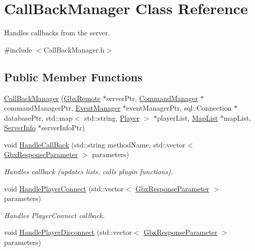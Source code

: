 \hypertarget{classCallBackManager}{\section{Call\-Back\-Manager Class Reference}
\label{classCallBackManager}
}


Handles callbacks from the server.  




{\ttfamily \#include $<$Call\-Back\-Manager.\-h$>$}

\subsection*{Public Member Functions}
\begin{DoxyCompactItemize}
\item 
\hyperlink{classCallBackManager_a8264fac119580102b33819fea6c78ef0}{Call\-Back\-Manager} (\hyperlink{classGbxRemote}{Gbx\-Remote} $\ast$server\-Ptr, \hyperlink{classCommandManager}{Command\-Manager} $\ast$command\-Manager\-Ptr, \hyperlink{classEventManager}{Event\-Manager} $\ast$event\-Manager\-Ptr, sql\-::\-Connection $\ast$database\-Ptr, std\-::map$<$ std\-::string, \hyperlink{structPlayer}{Player} $>$ $\ast$player\-List, \hyperlink{classMapList}{Map\-List} $\ast$map\-List, \hyperlink{structServerInfo}{Server\-Info} $\ast$server\-Info\-Ptr)
\item 
void \hyperlink{classCallBackManager_a8af5305f668aae4c563e7039b99015c2}{Handle\-Call\-Back} (std\-::string method\-Name, std\-::vector$<$ \hyperlink{classGbxResponseParameter}{Gbx\-Response\-Parameter} $>$ parameters)
\begin{DoxyCompactList}\small\item\em Handles callback (updates lists, calls plugin functions). \end{DoxyCompactList}\item 
void \hyperlink{classCallBackManager_a48e888c80841cf757ebdd69726a8aed5}{Handle\-Player\-Connect} (std\-::vector$<$ \hyperlink{classGbxResponseParameter}{Gbx\-Response\-Parameter} $>$ parameters)
\begin{DoxyCompactList}\small\item\em Handles Player\-Connect callback. \end{DoxyCompactList}\item 
void \hyperlink{classCallBackManager_aa762cbece4e59d8395f5dbd857c53f17}{Handle\-Player\-Disconnect} (std\-::vector$<$ \hyperlink{classGbxResponseParameter}{Gbx\-Response\-Parameter} $>$ parameters)

\end{DoxyCompactItemize}
